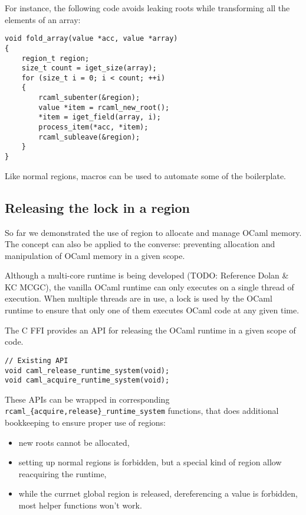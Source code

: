 \documentclass[a4paper]{easychair}
\begin{document}
For instance, the following code avoids leaking roots while transforming
all the elements of an array:

\begin{lstlisting}[]
void fold_array(value *acc, value *array)
{
    region_t region;
    size_t count = iget_size(array);
    for (size_t i = 0; i < count; ++i)
    {
        rcaml_subenter(&region);
        value *item = rcaml_new_root();
        *item = iget_field(array, i);
        process_item(*acc, *item);
        rcaml_subleave(&region);
    }
}
\end{lstlisting}

Like normal regions, macros can be used to automate some of the
boilerplate.

\subsection{Releasing the lock in a region}

So far we demonstrated the use of region to allocate and manage OCaml
memory. The concept can also be applied to the converse: preventing
allocation and manipulation of OCaml memory in a given scope.

Although a multi-core runtime is being developed (TODO: Reference Dolan
\& KC MCGC), the vanilla OCaml runtime can only executes on a single
thread of execution. When multiple threads are in use, a lock is used by
the OCaml runtime to ensure that only one of them executes OCaml code at
any given time.

The C FFI provides an API for releasing the OCaml runtime in a given
scope of code.

\begin{lstlisting}[]
// Existing API
void caml_release_runtime_system(void);
void caml_acquire_runtime_system(void);
\end{lstlisting}

These APIs can be wrapped in corresponding
\texttt{rcaml\_\{acquire,release\}\_runtime\_system} functions, that
does additional bookkeeping to ensure proper use of regions:

\begin{itemize}
\item new roots cannot be allocated,
\item setting up normal regions is forbidden, but a special kind of region
      allow reacquiring the runtime,
\item while the currnet global region is released, dereferencing a value is
      forbidden, most helper functions won't work.
\end{itemize}
\end{document}
